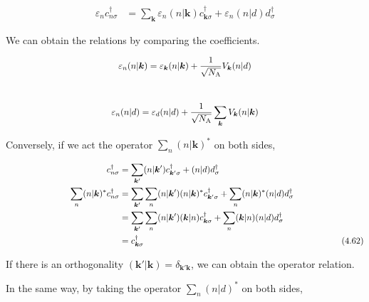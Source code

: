 \documentclass[a4j]{jarticle}
\begin{document}
\begin{align}
	\varepsilon_{n}
	c_{n \sigma}^{\dagger}
	 & =
	\sum_{\bm{k}}
	\varepsilon_{n}
	( n | \bm{k} )
	c^{\dagger}_{\bm{k} \sigma}
	+
	\varepsilon_{n}
	( n | d )
	d^{\dagger}_{\sigma}
\end{align}

We can obtain the relations by comparing the coefficients.

\begin{align}
	\hspace{44.3mm}
	\varepsilon_{n}
	( n | \bm{k} )
	=
	\varepsilon_{\bm{k}}
	( n | \bm{k} )
	+
	\frac{1}{\sqrt{N_{\rm A}}}
	V_{\bm{k}} (n | d)
	\hspace{44.3mm}
\end{align}
\\[-10mm]
\begin{align}
	\hspace{41.5mm}
	\varepsilon_{n}
	( n | d )
	=
	\varepsilon_{d}
	( n | d )
	+
	\frac{1}{\sqrt{N_{\rm A}}}
	\sum_{\bm{k}}
	V_{\bm{k}} (n | \bm{k})
	\hspace{41.5mm}
\end{align}

Conversely, if we act the operator $\displaystyle \sum_{n} ( n | \bm{k} )^{*}$ on both sides,

\begin{align}
	c^{\dagger}_{n \sigma}
	 & =
	\sum_{\bm{k}'}
	( n | \bm{k}' )
	c^{\dagger}_{\bm{k}' \sigma}
	+
	( n | d )
	d^{\dagger}_{\sigma}
	\nonumber \\
	\hspace{26mm}
	\sum_{n} ( n | \bm{k} )^{*}
	c^{\dagger}_{n \sigma}
	 & =
	\sum_{\bm{k}'}
	\sum_{n}
	( n | \bm{k}' )
	( n | \bm{k} )^{*}
	c^{\dagger}_{\bm{k}' \sigma}
	+
	\sum_{n} ( n | \bm{k} )^{*}
	( n | d )
	d^{\dagger}_{\sigma}
	\nonumber \\ &=
	\sum_{\bm{k}'}
	\sum_{n}
	( n | \bm{k}' )
	( \bm{k} | n )
	c^{\dagger}_{\bm{k} \sigma}
	+
	\sum_{n}
	( \bm{k} | n )
	( n | d )
	d^{\dagger}_{\sigma}
	\nonumber \\ &=
	c^{\dagger}_{\bm{k} \sigma}
	\nonumber
	\hspace{80mm}
	(4.62)
\end{align}

If there is an orthogonality $\displaystyle
	(\bm{k}'|\bm{k})=\delta_{\bm{k}' \bm{k}}
$, we can obtain the operator relation.

In the same way, by taking the operator $\displaystyle \sum_{n} ( n | d )^{*}$ on both sides,
\end{document}
